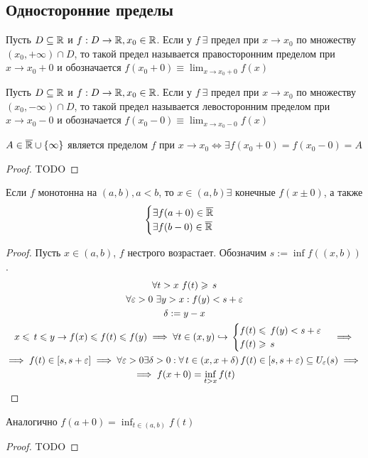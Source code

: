 \subsection{Односторонние пределы}
\begin{definition}
	Пусть $ D \subseteq \mathbb{R} $ и $ f: D \to  \mathbb{R}, x_0 \in \mathbb{R} $. Если у $ f\ \exists  $ предел при $ x \to x_0 $ по множеству $ (x_0, +\infty)\cap D $,
	то такой предел называется правосторонним пределом при $ x \to x_0 + 0 $ и обозначается $ f(x_0 + 0) \equiv \lim_{x \to x_0 + 0} f(x)$
\end{definition}
\begin{definition}
	Пусть $ D \subseteq \mathbb{R} $ и $ f: D \to  \mathbb{R}, x_0 \in \mathbb{R} $. Если у $ f\ \exists  $ предел при $ x \to x_0 $ по множеству $ (x_0, -\infty)\cap D $,
	то такой предел называется левосторонним пределом при $ x \to x_0 - 0 $ и обозначается $ f(x_0 - 0) \equiv \lim_{x \to x_0 - 0} f(x)$
\end{definition}
\begin{proposition}
	 $ A \in \overline{\mathbb{R}} \cup \{\infty\} $ является пределом $ f $ при $ x \to x_0 \Longleftrightarrow \exists  f(x_0 + 0) = f(x_0 - 0) = A$
\end{proposition}
\begin{proof}
	TODO
\end{proof}
\begin{theorem}
	Если $ f $ монотонна на $ (a, b), a < b $, то $ x \in  (a, b) \exists \text{ конечные } f(x\pm 0)$, а также \begin{gather}
		\begin{cases} \exists f(a + 0) \in \overline{\mathbb{R}} \\
		\exists f(b - 0 ) \in \overline{\mathbb{R}}\end{cases} 
	\end{gather}
\end{theorem} \begin{proof}
	Пусть $ x \in (a, b) $, $ f $ нестрого возрастает. Обозначим $ s:= \inf f((x, b)) $. \begin{gather}
		\forall t > x \ f(t) \geqslant\, s \\ 
		\forall \varepsilon > 0 \ \exists y > x: f(y) < s + \varepsilon \\
		\delta : = y - x \\
		x \leqslant\, t \leqslant y \to f(x) \leqslant f(t) \leqslant f(y) \implies \forall t \in (x, y)\hookrightarrow\,\begin{cases}   f(t) \leqslant\,f(y) < s + \varepsilon \\
		f(t) \geqslant\, s \end{cases} \implies \\
		 \implies f(t) \in [s, s + \varepsilon] \implies \forall \varepsilon > 0 \exists \delta > 0 : \forall\, t \in (x, x + \delta)\, f(t) \in [s, s + \varepsilon) \subseteq U_{\varepsilon}(s) \implies\, \\ 
		 \implies f(x + 0) = \inf_{t > x}f(t)
	\end{gather}
\end{proof}
\begin{proposition}
	Аналогично $ f(a +0) = \inf_{t \in (a, b)}f(t) $
\end{proposition}
\begin{proof}
	TODO
\end{proof}
